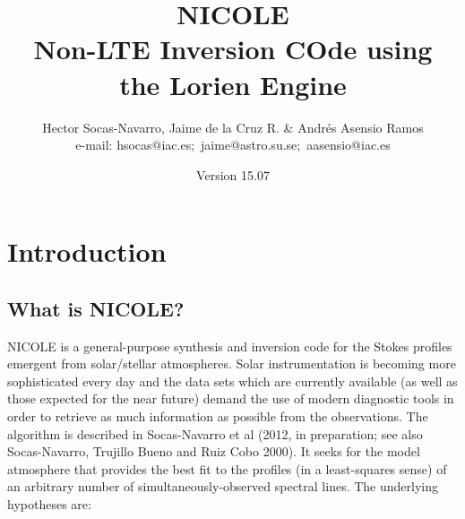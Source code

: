 

\title{NICOLE \\
Non-LTE Inversion COde using \\
the Lorien Engine}

\author{Hector Socas-Navarro,
    Jaime de la Cruz R. \& Andr\'es Asensio Ramos \\
%
e-mail: \mbox{hsocas@iac.es; jaime@astro.su.se; aasensio@iac.es}\\
}

\date{Version 15.07}

\maketitle


\tableofcontents



\chapter{Introduction}
\section{What is NICOLE?}

NICOLE is a general-purpose synthesis and inversion code for the
Stokes profiles emergent from solar/stellar atmospheres.  Solar
instrumentation is becoming more sophisticated every day and the data
sets which are currently available (as well as those expected for the
near future) demand the use of modern diagnostic tools in order to
retrieve as much information as possible from the observations.  The
algorithm is described in Socas-Navarro et al (2012, in preparation;
see also Socas-Navarro, Trujillo Bueno and Ruiz Cobo 2000). It seeks
for the model atmosphere that provides the best fit to the profiles
(in a least-squares sense) of an arbitrary number of
simultaneously-observed spectral lines.  The underlying hypotheses
are:

